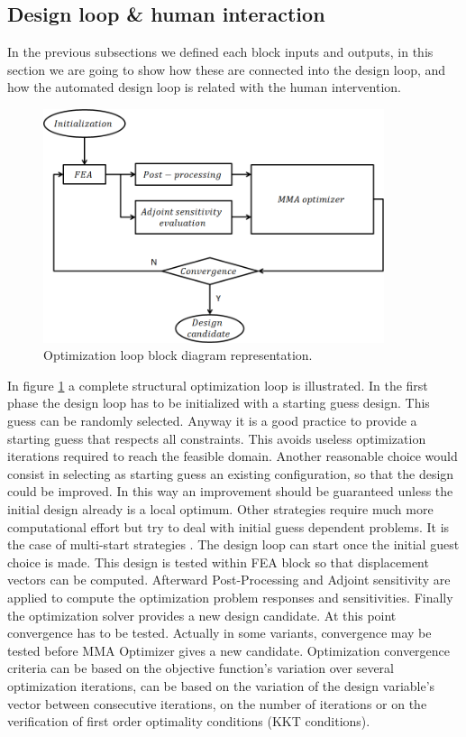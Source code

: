 \subsection{Design loop \& human interaction} 
In the previous subsections we defined each block inputs and outputs, in this section we are going to show how these are connected into the design loop, and how the automated design loop is related with the human intervention.
\begin{figure}[ht]
\centering
\includegraphics[width=10cm]{images/Ch2/optimization_loop}
\caption{Optimization loop block diagram representation.}
\label{fig.2.7}
\end{figure}
In figure \ref{fig.2.7} a complete structural optimization loop is illustrated. In the first phase the design loop has to be initialized with a starting guess design. This guess can be randomly selected. Anyway it is a good practice to provide a starting guess that respects all constraints. This avoids useless optimization iterations required to reach the feasible domain. Another reasonable choice would consist in selecting as starting guess an existing configuration, so that the design could be improved. In this way an improvement should be guaranteed unless the initial design already is a local optimum. Other strategies require much more computational effort but try to deal with initial guess dependent problems. It is the case of multi-start strategies \cite{dixon1975towards}. The design loop can start once the initial guest choice is made. This design is tested within FEA block so that displacement vectors can be computed. Afterward Post-Processing and Adjoint sensitivity are applied to compute the optimization problem responses and sensitivities. Finally the optimization solver provides a new design candidate. At this point convergence has to be tested. Actually in some variants, convergence may be tested before MMA Optimizer gives a new candidate. Optimization convergence criteria can be based on the objective function's variation over several optimization iterations, can be based on the variation of the design variable's vector between consecutive iterations, on the number of iterations or on the verification of first order optimality conditions (KKT conditions).
